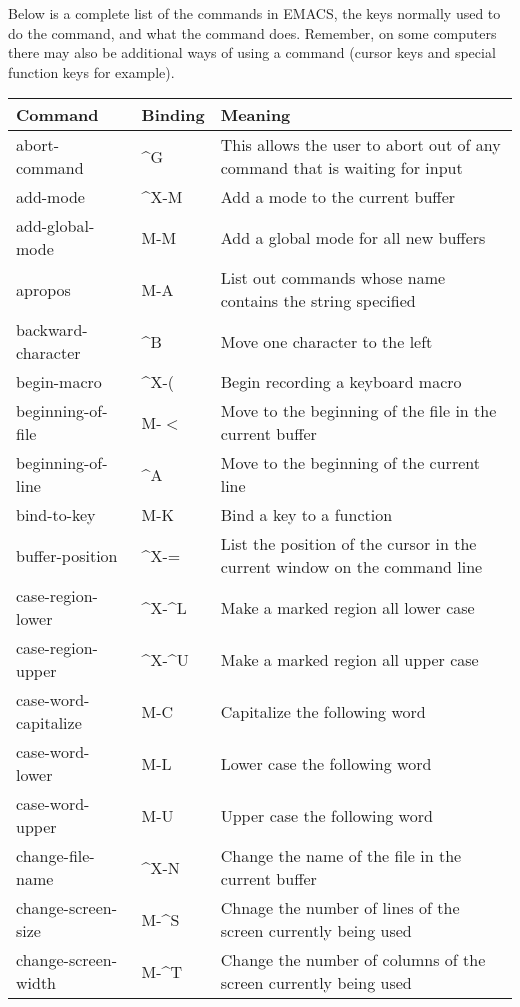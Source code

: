 Below is a complete list of the commands in EMACS, the keys
normally used to do the command, and what the command does.  Remember,
on some computers there may also be additional ways of using a command
(cursor keys and special function keys for example).

\begin{tabular}{llp{300pt}}
Command & Binding & Meaning\\ \hline
abort-command &  \^{}G & This allows the user to abort out of any
command that is waiting for input\\

add-mode &  \^{}X-M & Add a mode to the current buffer\\

add-global-mode  &  M-M & Add a global mode for all new buffers\\

apropos  &  M-A & List out commands whose name contains
the string specified\\

backward-character &  \^{}B & Move one character to the left\\

begin-macro &  \^{}X-( & Begin recording a keyboard macro\\

beginning-of-file &  M-$<${} & Move to the beginning of the file in
the current buffer\\

beginning-of-line &  \^{}A & Move to the beginning of the current line\\

bind-to-key &  M-K & Bind a key to a function\\

buffer-position  &  \^{}X-= & List the position of the cursor in the
current window on the command line\\

case-region-lower &  \^{}X-\^{}L & Make a marked region all lower case\\

case-region-upper &  \^{}X-\^{}U & Make a marked region all upper case\\

case-word-capitalize &  M-C & Capitalize the following word\\

case-word-lower  &  M-L & Lower case the following word\\

case-word-upper  &  M-U & Upper case the following word\\

change-file-name &  \^{}X-N & Change the name of the file in the
 current buffer\\

change-screen-size &  M-\^{}S & Chnage the number of lines of the screen
currently being used\\

change-screen-width &  M-\^{}T & Change the number of columns of the
screen currently being used\\
\end{tabular}

